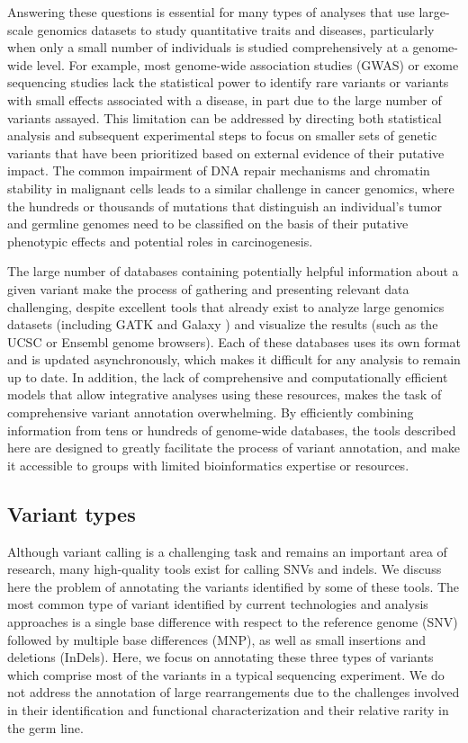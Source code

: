 Answering these questions is essential for many types of analyses that use large-scale genomics datasets to study quantitative traits and diseases, particularly when only a small number of individuals is studied comprehensively at a genome-wide level. For example, most genome-wide association studies (GWAS) or exome sequencing studies lack the statistical power to identify rare variants or variants with small effects associated with a disease, in part due to the large number of variants assayed. This limitation can be addressed by directing both statistical analysis and subsequent experimental steps to focus on smaller sets of genetic variants that have been prioritized based on external evidence of their putative impact. The common impairment of DNA repair mechanisms and chromatin stability in malignant cells leads to a similar challenge in cancer genomics, where the hundreds or thousands of mutations that distinguish an individual's tumor and germline genomes need to be classified on the basis of their putative phenotypic effects and potential roles in carcinogenesis.

The large number of databases containing potentially helpful information about a given variant make the process of gathering and presenting relevant data challenging, despite excellent tools that already exist to analyze large genomics datasets (including GATK \cite{mckenna2010genome} and Galaxy \cite{goecks2010galaxy}) and visualize the results (such as the UCSC \cite{karolchik2014ucsc} or Ensembl \cite{flicek2012ensembl} genome browsers). Each of these databases uses its own format and is updated asynchronously, which makes it difficult for any analysis to remain up to date. In addition, the lack of comprehensive and computationally efficient models that allow integrative analyses using these resources, makes the task of comprehensive variant annotation overwhelming. By efficiently combining information from tens or hundreds of genome-wide databases, the tools described here are designed to greatly facilitate the process of variant annotation, and make it accessible to groups with limited bioinformatics expertise or resources.

\subsection{Variant types}

Although variant calling is a challenging task and remains an important area of research, many high-quality tools exist for calling SNVs and indels.
We discuss here the problem of annotating the variants identified by some of these tools.
The most common type of variant identified by current technologies and analysis approaches is a single base difference with respect to the reference genome (SNV) followed by multiple base differences (MNP), as well as small insertions and deletions (InDels). Here, we focus on annotating these three types of variants which comprise most of the variants in a typical sequencing experiment. We do not address the annotation of large rearrangements due to the challenges involved in their identification and functional characterization and their relative rarity in the germ line.

